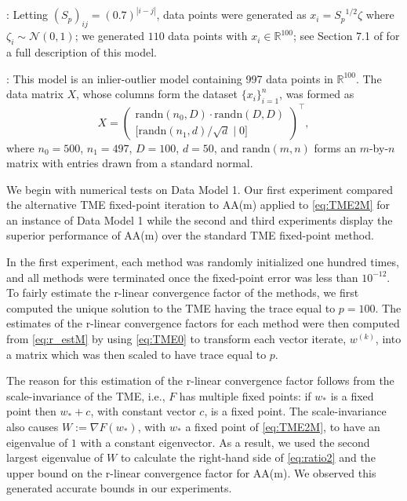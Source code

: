 \documentclass[11pt]{article}
\newcommand{\R}{\mathbb{R}}
\begin{document}
: Letting $(S_p)_{ij}=(0.7)^{|i-j|}$, data points were generated as $x_i = {S_p}^{1/2}{\zeta}$ where $\zeta_i \sim \mathcal{N}(0,1)$; we generated $110$ data points with $x_i \in \R^{100}$; see Section 7.1 of \cite{goes2020robust} for a full description of this model. 
 
: This model is an inlier-outlier model containing 997 data points in $\R^{100}$. The data matrix ${X}$, whose columns form the dataset $\{x_i\}_{i=1}^{n}$, was formed as
\[
{X} = \begin{pmatrix}   
                \text{randn}(n_0,D)\cdot\text{randn}(D,D) \\
                \big[\text{randn}(n_1,d)/\sqrt{d}\; | \; {0} \big] 
        \end{pmatrix}^\top, 
\]
where $n_0 = 500$, $n_1 = 497$, $D=100$, $d=50$, and $\text{randn}(m,n)$ forms an $m$-by-$n$ matrix with entries drawn from a standard normal. 

We begin with numerical tests on Data Model 1. Our first experiment compared the alternative TME fixed-point iteration to AA(m) applied to \eqref{eq:TME2M} for an instance of Data Model 1 %
while the second and third experiments display the superior performance of AA(m) over the standard TME fixed-point method. 

In the first experiment, each method was randomly initialized one hundred times, and all methods were terminated once the fixed-point error was less than $10^{-12}$. To fairly estimate the r-linear convergence factor of the methods, we first computed the unique solution to the TME having the trace equal to $p=100$. 
The estimates of the r-linear convergence factors for each method were then computed from \eqref{eq:r_estM} by using 
\eqref{eq:TME0} to transform each vector iterate, ${w}^{(k)}$, into a matrix which was then scaled to have trace equal to $p$. 

The reason for this estimation of the r-linear convergence factor follows from the scale-invariance of the TME, i.e., ${F}$ has multiple fixed points: if $w_*$ is a fixed point then $w_*+ {c}$, with constant vector ${c}$, is a fixed point. 
The scale-invariance also causes $W:=\nabla {F}({w}_*)$, with ${w}_*$ a fixed point of \eqref{eq:TME2M}, to have an eigenvalue of $1$ with a constant eigenvector. 
As a result, we used the second largest eigenvalue of $W$ to calculate the right-hand side of \eqref{eq:ratio2} and the upper bound on the r-linear convergence factor for AA(m). 
We observed this generated accurate bounds in our experiments.
\end{document}
